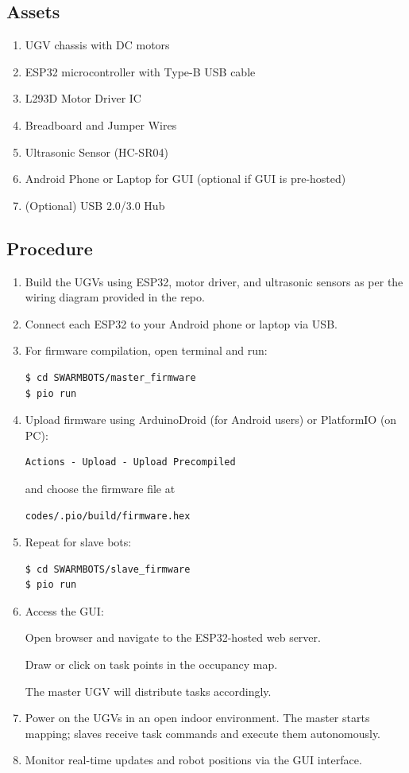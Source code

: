 \documentclass[conference]{IEEEtran}
\begin{document}
\subsection{Assets}
\begin{enumerate}
    \item UGV chassis with DC motors
    \item ESP32 microcontroller with Type-B USB cable
    \item L293D Motor Driver IC
    \item Breadboard and Jumper Wires
    \item Ultrasonic Sensor (HC-SR04)
    \item Android Phone or Laptop for GUI (optional if GUI is pre-hosted)
    \item (Optional) USB 2.0/3.0 Hub
\end{enumerate}
\subsection{Procedure}
\begin{enumerate}
    \item Build the UGVs using ESP32, motor driver, and ultrasonic sensors as per the wiring diagram provided in the repo.
    \item Connect each ESP32 to your Android phone or laptop via USB.
    \item For firmware compilation, open terminal and run:
        \begin{lstlisting}
$ cd SWARMBOTS/master_firmware
$ pio run
        \end{lstlisting}
    \item Upload firmware using ArduinoDroid (for Android users) or PlatformIO (on PC):
        \begin{lstlisting}
Actions - Upload - Upload Precompiled
        \end{lstlisting}
    and choose the firmware file at
        \begin{lstlisting}
codes/.pio/build/firmware.hex
        \end{lstlisting}
   
\item 
Repeat for slave bots:
        \begin{lstlisting}
$ cd SWARMBOTS/slave_firmware
$ pio run
        \end{lstlisting}
        \item Access the GUI:

Open browser and navigate to the ESP32-hosted web server.

Draw or click on task points in the occupancy map.

The master UGV will distribute tasks accordingly.


         \item  Power on the UGVs in an open indoor environment. The master starts mapping; slaves receive task commands and execute them autonomously.
          \item  Monitor real-time updates and robot positions via the GUI interface. 
          
\end{enumerate}
\end{document}
